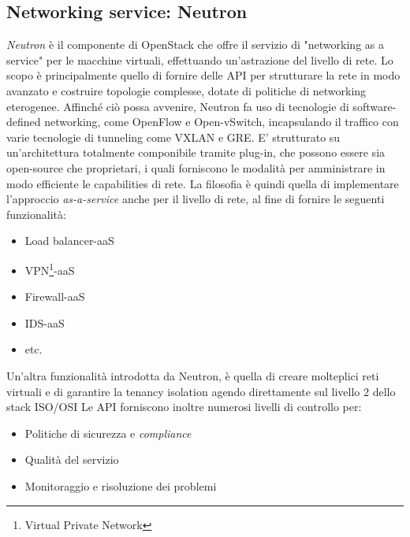 \subsection{Networking service: Neutron}
\textit{Neutron} è il componente di OpenStack che offre il servizio di "networking as a service" per le macchine virtuali, effettuando un'astrazione del livello di rete.
Lo scopo è principalmente quello di fornire delle API per strutturare la rete in modo avanzato e costruire topologie complesse, dotate di politiche di networking eterogenee.
Affinché ciò possa avvenire, Neutron fa uso di tecnologie di software-defined networking, come OpenFlow e Open-vSwitch, incapsulando il traffico con varie tecnologie di tunneling come VXLAN e GRE.
E' strutturato su un'architettura totalmente componibile tramite plug-in, che possono essere sia open-source che proprietari, i quali forniscono le modalità per amministrare in modo efficiente le capabilities di rete.
La filosofia è quindi quella di implementare l'approccio \textit{as-a-service} anche per il livello di rete, al fine di fornire le seguenti funzionalità:
\begin{itemize}
\item Load balancer-aaS
\item VPN\footnote{Virtual Private Network}-aaS
\item Firewall-aaS
\item IDS-aaS
\item etc.
\end{itemize}
Un'altra funzionalità introdotta da Neutron, è quella di creare molteplici reti virtuali e di garantire la tenancy isolation agendo direttamente sul livello 2 dello stack ISO/OSI
Le API forniscono inoltre numerosi livelli di controllo per:
\begin{itemize}
\item Politiche di sicurezza e \textit{compliance}
\item Qualità del servizio
\item Monitoraggio e risoluzione dei problemi
\end{itemize}


